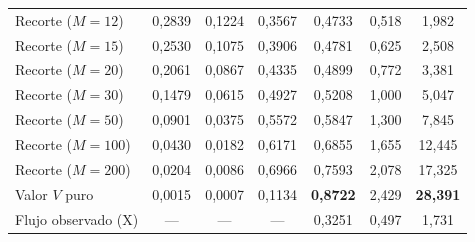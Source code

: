 \begin{table}[ht]
\begin{tabular}{@{}l cccccc@{}}
Recorte ($M=12$) & 0{,}2839 & 0{,}1224 & 0{,}3567 & 0{,}4733 & 0{,}518 & 1{,}982 \\
Recorte ($M=15$) & 0{,}2530 & 0{,}1075 & 0{,}3906 & 0{,}4781 & 0{,}625 & 2{,}508 \\
Recorte ($M=20$) & 0{,}2061 & 0{,}0867 & 0{,}4335 & 0{,}4899 & 0{,}772 & 3{,}381 \\
Recorte ($M=30$) & 0{,}1479 & 0{,}0615 & 0{,}4927 & 0{,}5208 & 1{,}000 & 5{,}047 \\
Recorte ($M=50$) & 0{,}0901 & 0{,}0375 & 0{,}5572 & 0{,}5847 & 1{,}300 & 7{,}845 \\
Recorte ($M=100$) & 0{,}0430 & 0{,}0182 & 0{,}6171 & 0{,}6855 & 1{,}655 & 12{,}445 \\
Recorte ($M=200$) & 0{,}0204 & 0{,}0086 & 0{,}6966 & 0{,}7593 & 2{,}078 & 17{,}325 \\
\midrule
Valor $V$ puro & 0{,}0015 & 0{,}0007 & 0{,}1134 & \textbf{0{,}8722} & 2{,}429 & \textbf{28{,}391} \\
\midrule
Flujo observado (X) & --- & --- & --- & 0{,}3251 & 0{,}497 & 1{,}731 \\
\bottomrule
\end{tabular}
\end{table}

